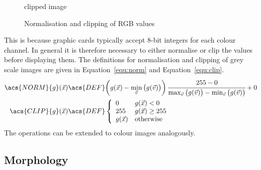 \documentclass[12pt,a4paper,oneside,openright]{book}
\newcommand{\equ}[1]{Equation~\ref{equ:#1}}
\begin{document}
\begin{CJK}{UTF8}{}
\begin{figure}[htbp]
\begin{center}
\begin{minipage}[t]{.3\textwidth}
\begin{center}
        clipped image
      \end{center}
    \end{minipage}
    \caption{Normalisation and clipping of \acs{RGB} values\label{fig:norm}}
  \end{center}
\end{figure}
This is because graphic cards typically accept 8-bit integers for each colour channel. In general it is therefore necessary to either normalise or clip the values before displaying them. The definitions for normalisation and clipping of grey scale images are given in \equ{norm} and \equ{clip}.
\begin{align}
  \acs{NORM}\{g\}(\vec{x})&\acs{DEF}\bigg(g(\vec{x})-\mathop{\operatorname{min}}_{\vec{v}}\big(g(\vec{v})\big)\bigg)\,\cfrac{255-0}{\mathop{\operatorname{max}}_{\vec{v}}\big(g(\vec{v})\big)-\mathop{\operatorname{min}}_{\vec{v}}\big(g(\vec{v})\big)}\label{equ:norm}+0\\
  \acs{CLIP}\{g\}(\vec{x})&\acs{DEF}\left\{\begin{array}{ll}0&g(\vec{x})<0\\255&g(\vec{x})\ge 255\\g(\vec{x})&\mathrm{otherwise}\end{array}\right.\label{equ:clip}
\end{align}
The operations can be extended to colour images analogously.

\subsection{Morphology}

\end{CJK}
\end{document}
